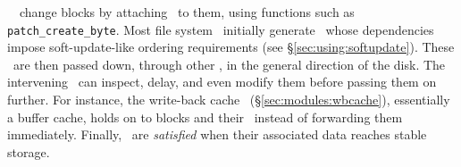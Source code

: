 \Kudos\ \modules\ change blocks by attaching \chdescs\ to them, using functions
such as \texttt{patch\_create\_byte}. Most file system \modules\ initially
generate \chdescs\ whose dependencies impose soft-update-like ordering
requirements (see \S\ref{sec:using:softupdate}). These \chdescs\ are then
passed down, through other \modules, in the general direction of the disk. The
intervening \modules\ can inspect, delay, and even modify them before passing
them on further. For instance, the write-back cache \module\
(\S\ref{sec:modules:wbcache}), essentially a buffer cache, holds on to blocks
and their \chdescs\ instead of forwarding them immediately. Finally, \chdescs\
are \emph{satisfied} when their associated data reaches stable storage.








